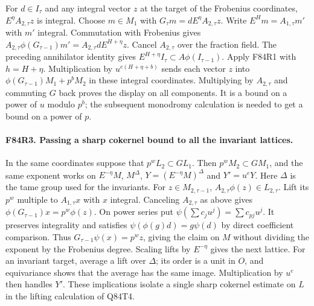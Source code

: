 For $d\in I_\tau$ and any integral vector $z$ at the target
of the Frobenius coordinates, $E^\eta A_{2,\tau} z$ is integral.
Choose $m\in M_1$ with $G_\tau m=d E^\eta A_{2,\tau}z$.
Write $E^H m=A_{1,\tau}m'$ with $m'$ integral. Commutation with
Frobenius gives
$A_{2,\tau}\phi(G_{\tau-1})m'=
 A_{2,\tau}dE^{H+\eta}z$. Cancel $A_{2,\tau}$ over the
fraction field. The preceding annihilator identity gives
$E^{H+\eta}I_\tau\subset A\phi(I_{\tau-1})$.
Apply F84R1 with $h=H+\eta$. Multiplication by
$u^{e(H+\eta+b)}$ sends each vector $z$ into
$\phi(G_{\tau-1})M_1+p^b M_2$ in these integral coordinates.
Multiplying by $A_{2,\tau}$ and commuting $G$ back proves the
display on all components. It is a bound on a power of $u$
modulo $p^b$; the subsequent monodromy calculation is needed
to get a bound on a power of $p$.

\paragraph{F84R3. Passing a sharp cokernel bound to all the invariant lattices.}
In the same coordinates suppose that $p^w L_2\subset G L_1$.
Then $p^w M_2\subset G M_1$, and the same exponent works on
$E^{-\eta}M$, $M^\Delta$, $Y=(E^{-\eta}M)^\Delta$ and
$Y'=u^e Y$. Here $\Delta$ is the tame group used for the
invariants. For $z\in M_{2,\tau-1}$,
$A_{2,\tau}\phi(z)\in L_{2,\tau}$. Lift its $p^w$ multiple
to $A_{1,\tau}x$ with $x$ integral. Canceling $A_{2,\tau}$
as above gives $\phi(G_{\tau-1})x=p^w\phi(z)$.
On power series put
$\psi(\sum c_j u^j)=\sum c_{pj}u^j$. It preserves
integrality and satisfies $\psi(\phi(g)d)=g\psi(d)$ by direct
coefficient comparison. Thus $G_{\tau-1}\psi(x)=p^w z$,
giving the claim on $M$ without dividing the exponent by the
Frobenius degree. Scaling lifts by $E^{-\eta}$ gives the
next lattice. For an invariant target, average a lift over
$\Delta$; its order is a unit in $O$, and equivariance shows
that the average has the same image. Multiplication by $u^e$
then handles $Y'$. These implications isolate a single sharp
cokernel estimate on $L$ in the lifting calculation of Q84T4.
